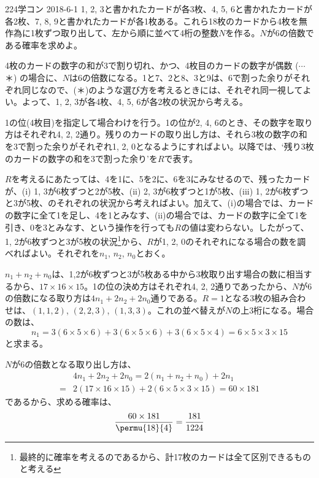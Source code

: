 \begin{thm}{224}{\maru}{学コン 2018-6-1}
 1, 2, 3と書かれたカードが各3枚、4, 5, 6と書かれたカードが各2枚、7, 8, 9と書かれたカードが各1枚ある。これら18枚のカードから4枚を無作為に1枚ずつ取り出して、左から順に並べて4桁の整数$N$を作る。$N$が6の倍数である確率を求めよ。
\end{thm}

4枚のカードの数字の和が3で割り切れ、かつ、4枚目のカードの数字が偶数 ($\cdots$ ＊) の場合に、$N$は6の倍数になる。1と7、2と8、3と9は、6で割った余りがそれぞれ同じなので、(＊)のような選び方を考えるときには、それぞれ同一視してよい。よって、1, 2, 3が各4枚、4, 5, 6が各2枚の状況から考える。

1の位(4枚目)を指定して場合わけを行う。1の位が2, 4, 6のとき、その数字を取り方はそれぞれ4, 2, 2通り。残りのカードの取り出し方は、それら3枚の数字の和を3で割った余りがそれぞれ1, 2, 0となるようにすればよい。以降では、`残り3枚のカードの数字の和を3で割った余り'を$R$で表す。

$R$を考えるにあたっては、4を1に、5を2に、6を3にみなせるので、残ったカードが、(i) 1, 3が6枚ずつと2が5枚、(ii) 2, 3が6枚ずつと1が5枚、(iii) 1, 2が6枚ずつと3が5枚、のそれぞれの状況から考えればよい。加えて、(i)の場合では、カードの数字に全て1を足し、4を1とみなす、(ii)の場合では、カードの数字に全て1を引き、0を3とみなす、という操作を行っても$R$の値は変わらない。したがって、1, 2が6枚ずつと3が5枚の状況\footnote{最終的に確率を考えるのであるから、計17枚のカードは全て区別できるものと考える}から、$R$が1, 2, 0のそれぞれになる場合の数を調べればよい。それぞれを$n_1$, $n_2$, $n_0$とおく。

$n_1+n_2+n_0$は、1,2が6枚ずつと3が5枚ある中から3枚取り出す場合の数に相当するから、$17\times 16\times 15$。1の位の決め方はそれぞれ4, 2, 2通りであったから、$N$が6の倍数になる取り方は$4n_1+2n_2+2n_0$通りである。$R=1$となる3枚の組み合わせは、$(1, 1, 2)$, $(2, 2, 3)$, $(1, 3, 3)$。これの並べ替えが$N$の上3桁になる。場合の数は、
\[ n_1=3(6\times 5\times 6)+3(6\times 5\times 6)+3(6\times 5\times 4)=6\times 5\times 3\times 15 \]
と求まる。

$N$が6の倍数となる取り出し方は、
\begin{align*}
 &4n_1+2n_2+2n_0=2(n_1+n_2+n_0)+2n_1 \\
 =&2(17\times 16\times 15) + 2(6\times 5\times 3\times 15) = 60\times 181
\end{align*}
であるから、求める確率は、
\[ \frac{60\times 181}{\permu{18}{4}}=\frac{181}{1224} \]